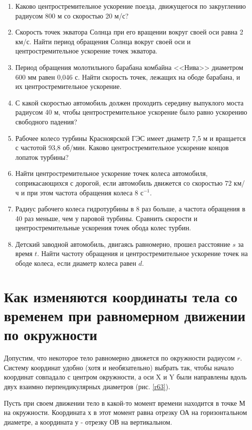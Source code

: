 \documentclass[a5paper, 10pt]{diss_4}
\renewcommand{\'}{\,'}
\begin{document}
\begin{enumerate}
\item Каково центростремительное ускорение поезда,  движущегося по закруглению радиусом 800 м со скоростью 20 м/с?
\item Скорость точек экватора Солнца при его вращении вокруг своей оси равна 2 км/с. Найти период обращения  Солнца вокруг своей оси и центростремительное ускорение точек экватора.
\item Период обращения молотильного барабана комбайна <<Нива>> диаметром 600 мм равен 0,046 с. Найти скорость точек, лежащих на ободе барабана, и их центростремительное ускорение.
\item С какой скоростью автомобиль должен проходить  середину выпуклого моста радиусом 40 м, чтобы  центростремительное ускорение было равно ускорению свободного  падения?
\item Рабочее колесо турбины Красноярской ГЭС имеет диаметр 7,5 м и вращается с частотой 93,8 об/мин. Каково центростремительное ускорение концов лопаток турбины?
\item Найти центростремительное ускорение точек колеса автомобиля, соприкасающихся с дорогой, если автомобиль движется со скоростью 72 км/ч и при этом частота обращения колеса 8 $с^{-1}$.
\item Радиус рабочего колеса гидротурбины в 8 раз  больше, а частота обращения в 40 раз меньше, чем у паровой  турбины. Сравнить скорости и центростремительные ускорения точек обода колес турбин.
\item Детский заводной автомобиль, двигаясь равномерно, прошел расстояние $s$ за время $t$. Найти частоту обращения и центростремительное ускорение точек на ободе колеса, если диаметр колеса равен $d$.
\end{enumerate}

\section{Как изменяются координаты тела со временем при равномерном движении по окружности}

  Допустим, что некоторое тело равномерно движется по окружности радиусом
$r$. Систему координат удобно (хотя и необязательно) выбрать так, чтобы начало
координат совпадало с центром окружности, а оси X и Y были направлены вдоль
двух взаимно перпендикулярных диаметров (рис. \ref{r63}).

  Пусть при своем движении тело в какой-то момент времени находится в
точке М на окружности. Координата х в этот момент равна отрезку ОА на
горизонтальном диаметре, а координата у - отрезку ОВ на вертикальном.
\end{document}
